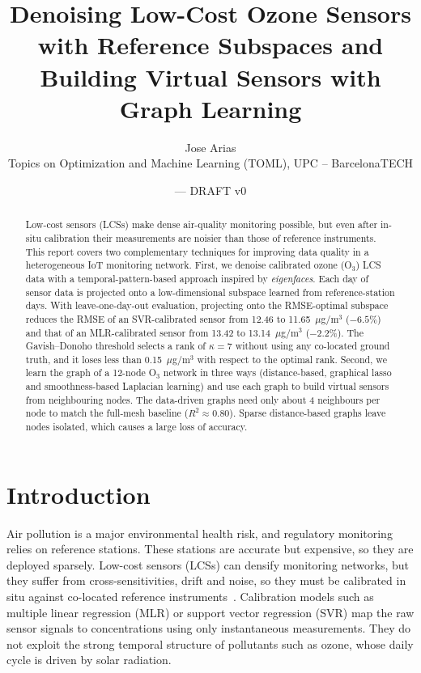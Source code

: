 \documentclass[11pt,a4paper]{article}
\title{Denoising Low-Cost Ozone Sensors with Reference Subspaces and\\ Building Virtual Sensors with Graph Learning}
\author{Jose Arias\\ \small Topics on Optimization and Machine Learning (TOML), UPC -- BarcelonaTECH}
\date{\todo{date} \quad --- \quad DRAFT v0}
\newcommand{\Othree}{O$_3$}
\newcommand{\ugm}{$\mu$g/m$^3$}
\begin{document}
\maketitle

\begin{abstract}
Low-cost sensors (LCSs) make dense air-quality monitoring possible, but even after in-situ calibration their measurements are noisier than those of reference instruments. This report covers two complementary techniques for improving data quality in a heterogeneous IoT monitoring network. First, we denoise calibrated ozone (\Othree) LCS data with a temporal-pattern-based approach inspired by \emph{eigenfaces}. Each day of sensor data is projected onto a low-dimensional subspace learned from reference-station days. With leave-one-day-out evaluation, projecting onto the RMSE-optimal subspace reduces the RMSE of an SVR-calibrated sensor from 12.46 to 11.65~\ugm{} ($-6.5\%$) and that of an MLR-calibrated sensor from 13.42 to 13.14~\ugm{} ($-2.2\%$). The Gavish--Donoho threshold selects a rank of $\kappa=7$ without using any co-located ground truth, and it loses less than 0.15~\ugm{} with respect to the optimal rank. Second, we learn the graph of a 12-node \Othree{} network in three ways (distance-based, graphical lasso and smoothness-based Laplacian learning) and use each graph to build virtual sensors from neighbouring nodes. The data-driven graphs need only about 4 neighbours per node to match the full-mesh baseline ($R^2\approx0.80$). Sparse distance-based graphs leave nodes isolated, which causes a large loss of accuracy.
\end{abstract}

\section{Introduction}
Air pollution is a major environmental health risk, and regulatory monitoring relies on reference stations. These stations are accurate but expensive, so they are deployed sparsely. Low-cost sensors (LCSs) can densify monitoring networks, but they suffer from cross-sensitivities, drift and noise, so they must be calibrated in situ against co-located reference instruments~\cite{spinelle2015,castell2017}. Calibration models such as multiple linear regression (MLR) or support vector regression (SVR) map the raw sensor signals to concentrations using only instantaneous measurements. They do not exploit the strong temporal structure of pollutants such as ozone, whose daily cycle is driven by solar radiation.
\end{document}
